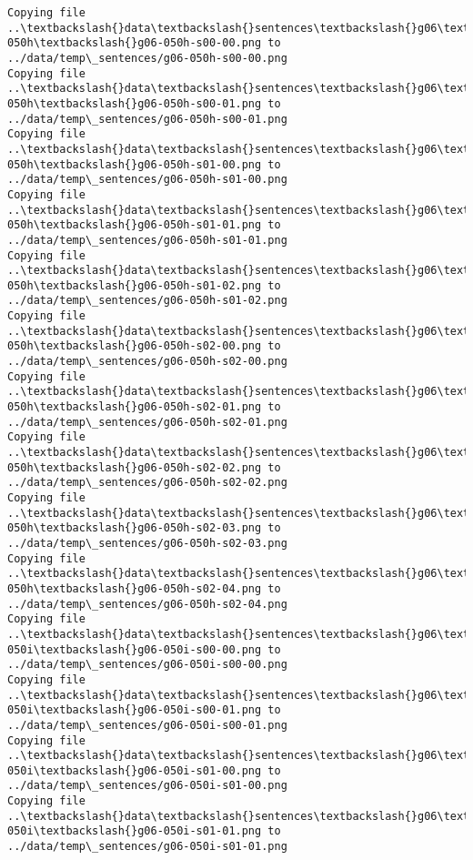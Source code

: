 \documentclass[11pt]{article}
\begin{document}
\begin{Verbatim}[commandchars=\\\{\}]
Copying file ..\textbackslash{}data\textbackslash{}sentences\textbackslash{}g06\textbackslash{}g06-050h\textbackslash{}g06-050h-s00-00.png to
../data/temp\_sentences/g06-050h-s00-00.png
Copying file ..\textbackslash{}data\textbackslash{}sentences\textbackslash{}g06\textbackslash{}g06-050h\textbackslash{}g06-050h-s00-01.png to
../data/temp\_sentences/g06-050h-s00-01.png
Copying file ..\textbackslash{}data\textbackslash{}sentences\textbackslash{}g06\textbackslash{}g06-050h\textbackslash{}g06-050h-s01-00.png to
../data/temp\_sentences/g06-050h-s01-00.png
Copying file ..\textbackslash{}data\textbackslash{}sentences\textbackslash{}g06\textbackslash{}g06-050h\textbackslash{}g06-050h-s01-01.png to
../data/temp\_sentences/g06-050h-s01-01.png
Copying file ..\textbackslash{}data\textbackslash{}sentences\textbackslash{}g06\textbackslash{}g06-050h\textbackslash{}g06-050h-s01-02.png to
../data/temp\_sentences/g06-050h-s01-02.png
Copying file ..\textbackslash{}data\textbackslash{}sentences\textbackslash{}g06\textbackslash{}g06-050h\textbackslash{}g06-050h-s02-00.png to
../data/temp\_sentences/g06-050h-s02-00.png
Copying file ..\textbackslash{}data\textbackslash{}sentences\textbackslash{}g06\textbackslash{}g06-050h\textbackslash{}g06-050h-s02-01.png to
../data/temp\_sentences/g06-050h-s02-01.png
Copying file ..\textbackslash{}data\textbackslash{}sentences\textbackslash{}g06\textbackslash{}g06-050h\textbackslash{}g06-050h-s02-02.png to
../data/temp\_sentences/g06-050h-s02-02.png
Copying file ..\textbackslash{}data\textbackslash{}sentences\textbackslash{}g06\textbackslash{}g06-050h\textbackslash{}g06-050h-s02-03.png to
../data/temp\_sentences/g06-050h-s02-03.png
Copying file ..\textbackslash{}data\textbackslash{}sentences\textbackslash{}g06\textbackslash{}g06-050h\textbackslash{}g06-050h-s02-04.png to
../data/temp\_sentences/g06-050h-s02-04.png
Copying file ..\textbackslash{}data\textbackslash{}sentences\textbackslash{}g06\textbackslash{}g06-050i\textbackslash{}g06-050i-s00-00.png to
../data/temp\_sentences/g06-050i-s00-00.png
Copying file ..\textbackslash{}data\textbackslash{}sentences\textbackslash{}g06\textbackslash{}g06-050i\textbackslash{}g06-050i-s00-01.png to
../data/temp\_sentences/g06-050i-s00-01.png
Copying file ..\textbackslash{}data\textbackslash{}sentences\textbackslash{}g06\textbackslash{}g06-050i\textbackslash{}g06-050i-s01-00.png to
../data/temp\_sentences/g06-050i-s01-00.png
Copying file ..\textbackslash{}data\textbackslash{}sentences\textbackslash{}g06\textbackslash{}g06-050i\textbackslash{}g06-050i-s01-01.png to
../data/temp\_sentences/g06-050i-s01-01.png

\end{Verbatim}
\end{document}
